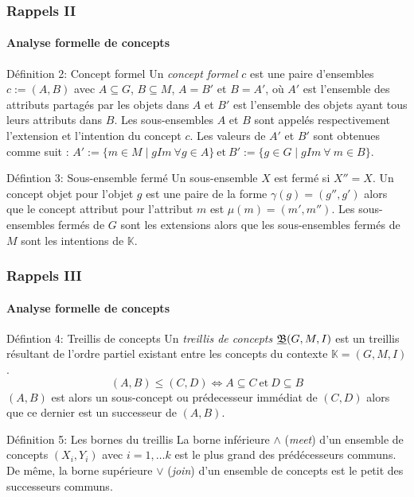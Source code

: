 \documentclass[french]{beamer}
\def\KK{\mathbb{K}}
\begin{document}
\begin{frame}
\frametitle{Rappels II}
\framesubtitle{Analyse formelle de concepts}
\begin{block}{Définition 2: Concept formel}
Un \emph{concept formel} $c$ est une paire d'ensembles $c:= (A,B)$ avec $A \subseteq G$, $B \subseteq M$, $A=B'$ et $B=A'$, où $A'$ est l'ensemble des attributs partagés par les objets dans $A$ et $B'$ est l'ensemble des objets ayant tous leurs attributs dans $B$. Les sous-ensembles $A$ et $B$ sont appelés respectivement l'extension et l'intention du concept $c$. Les valeurs de $A'$ et $B'$ sont obtenues comme suit : 
$A':=\{m \in M \mid g I m\ \forall g \in A\}\ \text{et}\ B':=\{g \in G \mid g I m\ \forall~m \in B\}$.
\end{block}
\begin{block}{Défintion 3: Sous-ensemble fermé}
Un sous-ensemble $X$ est fermé si $X''=X$. Un concept objet pour l'objet $g$ est une paire de la forme $\gamma(g)=(g'', g')$ alors que le concept attribut pour l'attribut $m$ est $\mu(m)=(m', m'')$.
Les sous-ensembles fermés de $G$ sont les extensions alors que les sous-ensembles fermés de $M$ sont les intentions de $\KK$.
\end{block}
\end{frame}

\begin{frame}
\frametitle{Rappels III}
\framesubtitle{Analyse formelle de concepts}
\begin{block}{Défintion 4: Treillis de concepts}
Un \textit{treillis de concepts} $\underline{{\mathfrak B}} (G,M,\mathrel{I})$ est un treillis résultant de l'ordre partiel existant entre les concepts du contexte $\KK = (G,M,I)$.
$$(A,B) \leq (C,D) \Leftrightarrow A \subseteq C\ \text{et}\ D \subseteq B$$
$(A, B)$ est alors un sous-concept ou prédecesseur immédiat de $(C, D)$ alors que ce dernier est un successeur de $(A, B)$.
\end{block}
\begin{block}{Définition 5: Les bornes du treillis}
La borne inférieure $\wedge$ (\emph{meet}) d'un ensemble de concepts $(X_i, Y_i)$ avec $i = 1, \ldots k$ est le plus grand des prédécesseurs communs. De même, la borne supérieure $\vee$ (\emph{join}) d'un ensemble de concepts est le petit des successeurs communs.
\end{block}
\end{frame}
\end{document}
